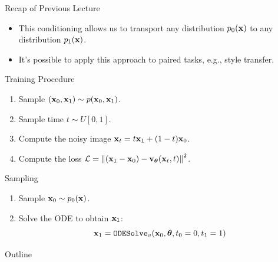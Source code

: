 \documentclass{beamer}
\begin{document}
\begin{frame}{Recap of Previous Lecture}
	\begin{itemize}
		\item This conditioning allows us to transport any distribution $p_0(\mathbf{x})$ to any distribution $p_1(\mathbf{x})$.
		\item It's possible to apply this approach to paired tasks, e.g., style transfer.
	\end{itemize}
	\begin{block}{Training Procedure}
		\begin{enumerate}
			\item Sample $(\mathbf{x}_0, \mathbf{x}_1) \sim p(\mathbf{x}_0, \mathbf{x}_1)$.
			\item Sample time $t \sim U[0, 1]$.
			\item Compute the noisy image $\mathbf{x}_t = t \mathbf{x}_1 + (1 - t) \mathbf{x}_0$.
			\item Compute the loss $ \mathcal{L} = \left\| (\mathbf{x}_1 - \mathbf{x}_0) - \mathbf{v}_{\boldsymbol{\theta}}(\mathbf{x}_t, t) \right\|^2 $.
		\end{enumerate}
	\end{block}
	\vspace{-0.3cm}
	\begin{block}{Sampling}
		\begin{enumerate}
			\item Sample $\mathbf{x}_0 \sim p_0(\mathbf{x})$.
							\item Solve the ODE to obtain $\mathbf{x}_1$:
			\[
				\mathbf{x}_1 = \texttt{ODESolve}_v(\mathbf{x}_0, \boldsymbol{\theta}, t_0=0, t_1=1)
			\]
		\end{enumerate}
	\end{block}
\end{frame}
\begin{frame}{Outline}
	\tableofcontents
\end{frame}
\end{document}
